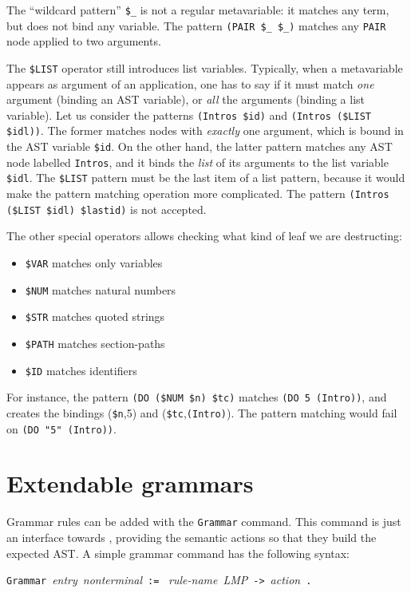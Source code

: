 The ``wildcard pattern'' \verb+$_+ is not a regular metavariable: it
matches any term, but does not bind any variable. The pattern
\verb+(PAIR $_ $_)+ matches any {\tt PAIR} node applied to two
arguments.

The {\tt\$LIST} operator still introduces list variables. Typically,
when a metavariable appears as argument of an application, one has to
say if it must match \emph{one} argument (binding an AST variable), or
\emph{all} the arguments (binding a list variable). Let us consider
the patterns \verb+(Intros $id)+ and \verb+(Intros ($LIST $idl))+. The
former matches nodes with \emph{exactly} one argument, which is bound
in the AST variable {\tt\$id}. On the other hand, the latter pattern
matches any AST node labelled {\tt Intros}, and it binds the
\emph{list} of its arguments to the list variable {\tt\$idl}. The
{\tt\$LIST} pattern must be the last item of a list pattern, because
it would make the pattern matching operation more complicated. The
pattern \verb+(Intros ($LIST $idl) $lastid)+ is not accepted.

The other special operators allows checking what kind of leaf we
are destructing:
\begin{itemize}
\item{\tt\$VAR} matches only variables
\item{\tt\$NUM} matches natural numbers
\item{\tt\$STR} matches quoted strings
\item{\tt\$PATH} matches section-paths
\item{\tt\$ID} matches identifiers
\end{itemize}
\noindent For instance, the pattern \verb+(DO ($NUM $n) $tc)+ matches
\verb+(DO 5 (Intro))+, and creates the bindings ({\tt\$n},5) and
({\tt\$tc},\verb+(Intro)+). The pattern matching would fail on
\verb+(DO "5" (Intro))+.

\section{Extendable grammars}
\label{Grammar}

Grammar rules can be added with the {\tt Grammar} command. This
command is just an interface towards {\camlpppp}, providing the
semantic actions so that they build the expected AST. A simple grammar
command has the following syntax: 

\begin{center}
\texttt{Grammar}~\textsl{entry}~\textsl{nonterminal}~\texttt{:=}~%
\textsl{rule-name}~\textsl{LMP}~\verb+->+~\textsl{action}~\texttt{.}
\end{center}

